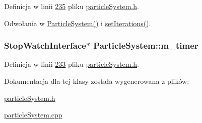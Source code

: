 Definicja w linii \hyperlink{particle_system_8h_source_l00235}{235} pliku \hyperlink{particle_system_8h_source}{particle\-System.\-h}.



Odwołania w \hyperlink{particle_system_8cpp_source_l00040}{Particle\-System()} i \hyperlink{particle_system_8h_source_l00078}{set\-Iterations()}.

\hypertarget{class_particle_system_af01e546384ef27bb1894a37f2a02e967}{
\subsubsection[{m\-\_\-timer}]{\setlength{\rightskip}{0pt plus 5cm}Stop\-Watch\-Interface$\ast$ Particle\-System\-::m\-\_\-timer\hspace{0.3cm}{\ttfamily [protected]}}}\label{class_particle_system_af01e546384ef27bb1894a37f2a02e967}


Definicja w linii \hyperlink{particle_system_8h_source_l00233}{233} pliku \hyperlink{particle_system_8h_source}{particle\-System.\-h}.



Dokumentacja dla tej klasy została wygenerowana z plików\-:\begin{DoxyCompactItemize}
\item 
\hyperlink{particle_system_8h}{particle\-System.\-h}\item 
\hyperlink{particle_system_8cpp}{particle\-System.\-cpp}\end{DoxyCompactItemize}

